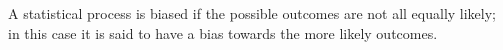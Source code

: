 A statistical process is biased if the possible outcomes are not all equally likely;
in this case it is said to have a bias towards the more likely outcomes.